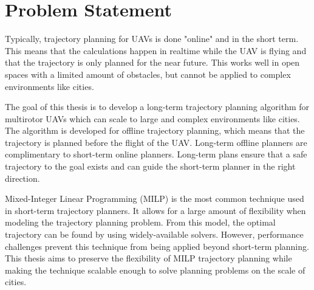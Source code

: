 \section{Problem Statement}
Typically, trajectory planning for UAVs is done "online" and in the short term. This means that the calculations happen in realtime while the UAV is flying and that the trajectory is only planned for the near future. This works well in open spaces with a limited amount of obstacles, but cannot be applied to complex environments like cities.
\par
The goal of this thesis is to develop a long-term trajectory planning algorithm for multirotor UAVs which can scale to large and complex environments like cities. The algorithm is developed for offline trajectory planning, which means that the trajectory is planned before the flight of the UAV. Long-term offline planners are complimentary to short-term online planners. Long-term plans ensure that a safe trajectory to the goal exists and can guide the short-term planner in the right direction.
\par
Mixed-Integer Linear Programming (MILP) is the most common technique used in short-term trajectory planners. It allows for a large amount of flexibility when modeling the trajectory planning problem. From this model, the optimal trajectory can be found by using widely-available solvers. However, performance challenges prevent this technique from being applied beyond short-term planning. This thesis aims to preserve the flexibility of MILP trajectory planning while making the technique scalable enough to solve planning problems on the scale of cities.

%
%


